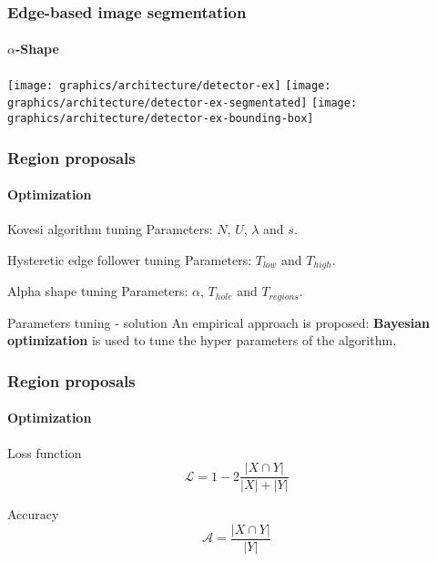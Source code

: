 \begin{frame}
	\frametitle{Edge-based image segmentation}
	\framesubtitle{$\alpha$-Shape}
	 {
			\texttt{[image: graphics/architecture/detector-ex]}
	}
	\only<2-3> {
			\texttt{[image: graphics/architecture/detector-ex-segmentated]}
	}
	\only<3-3> {
			\texttt{[image: graphics/architecture/detector-ex-bounding-box]}
	}
\end{frame}

\begin{frame}
    \frametitle{Region proposals}
    \framesubtitle{Optimization}
     {
        \begin{alertblock}{Kovesi algorithm tuning}
            Parameters: $N$, $U$, $\lambda$ and $s$.
        \end{alertblock}
    }
     {
        \begin{alertblock}{Hysteretic edge follower tuning}
        	Parameters: $T_{low}$ and $T_{high}$.
        \end{alertblock}
    }
     {
        \begin{alertblock}{Alpha shape tuning}
        	Parameters: $\alpha$, $T_{hole}$ and $T_{regions}$.
        \end{alertblock}
    }
     {
        \begin{exampleblock}{Parameters tuning - solution}
            An empirical approach is proposed: \textbf{Bayesian optimization} is used to tune the hyper parameters of the algorithm.
        \end{exampleblock}
    }
\end{frame}

\begin{frame}
	\frametitle{Region proposals}
	\framesubtitle{Optimization}
	\begin{block}{Loss function}
		\begin{equation*}
		\mathcal{L} = 1 - 2 \frac{\lvert X \cap Y \rvert}{\lvert X \rvert + \lvert Y \rvert}
		\end{equation*}
	\end{block}
	\begin{block}{Accuracy}
		\begin{equation*}
		\mathcal{A} = \frac{\lvert X \cap Y \rvert}{\lvert Y \rvert}
		\end{equation*}
	\end{block}
\end{frame}

